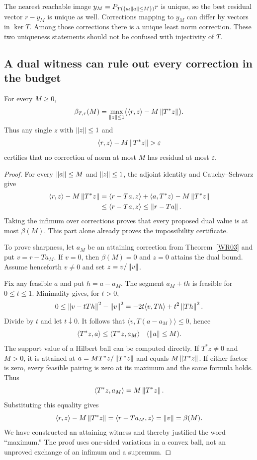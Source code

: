 The nearest reachable image $y_M=P_{T(\{a:\left\lVert a\right\rVert\le M\})}r$ is unique, so the best residual vector $r-y_M$ is unique as well. Corrections mapping to $y_M$ can differ by vectors in $\ker T$. Among those corrections there is a unique least norm correction. These two uniqueness statements should not be confused with injectivity of $T$.

\subsection{A dual witness can rule out every correction in the budget}
\begin{theorem}\label{WR04}
For every $M\ge0$,
\begin{equation}\label{eq:budget-dual}
 \beta_{T,r}(M)=
 \max_{\left\lVert z\right\rVert\le1}\bigl(\langle r,z\rangle-M\left\lVert T^*z\right\rVert\bigr).
\end{equation}
Thus any single $z$ with $\left\lVert z\right\rVert\le1$ and
\[
 \langle r,z\rangle-M\left\lVert T^*z\right\rVert>\varepsilon
\]
certifies that no correction of norm at most $M$ has residual at most $\varepsilon$.
\end{theorem}
\begin{proof}
For every $\left\lVert a\right\rVert\le M$ and $\left\lVert z\right\rVert\le1$, the adjoint identity and Cauchy--Schwarz give
\[
\begin{aligned}
 \langle r,z\rangle-M\left\lVert T^*z\right\rVert
 &=\langle r-Ta,z\rangle+\langle a,T^*z\rangle-M\left\lVert T^*z\right\rVert\\
 &\le\langle r-Ta,z\rangle
 \le\left\lVert r-Ta\right\rVert.
\end{aligned}
\]
Taking the infimum over corrections proves that every proposed dual value is at most $\beta(M)$. This part alone already proves the impossibility certificate.

To prove sharpness, let $a_M$ be an attaining correction from Theorem~\ref{WR03} and put $v=r-Ta_M$. If $v=0$, then $\beta(M)=0$ and $z=0$ attains the dual bound. Assume henceforth $v\ne0$ and set $z=v/\left\lVert v\right\rVert$.

Fix any feasible $a$ and put $h=a-a_M$. The segment $a_M+th$ is feasible for $0\le t\le1$. Minimality gives, for $t>0$,
\[
 0\le\left\lVert v-tTh\right\rVert^2-\left\lVert v\right\rVert^2
   =-2t\langle v,Th\rangle+t^2\left\lVert Th\right\rVert^2.
\]
Divide by $t$ and let $t\downarrow0$. It follows that $\langle v,T(a-a_M)\rangle\le0$, hence
\[
 \langle T^*z,a\rangle\le\langle T^*z,a_M\rangle
 \quad(\left\lVert a\right\rVert\le M).
\]
The support value of a Hilbert ball can be computed directly. If $T^*z\ne0$ and $M>0$, it is attained at $a=M T^*z/\left\lVert T^*z\right\rVert$ and equals $M\left\lVert T^*z\right\rVert$. If either factor is zero, every feasible pairing is zero at its maximum and the same formula holds. Thus
\[
 \langle T^*z,a_M\rangle=M\left\lVert T^*z\right\rVert.
\]
Substituting this equality gives
\[
 \langle r,z\rangle-M\left\lVert T^*z\right\rVert
 =\langle r-Ta_M,z\rangle=\left\lVert v\right\rVert=\beta(M).
\]
We have constructed an attaining witness and thereby justified the word ``maximum.'' The proof uses one-sided variations in a convex ball, not an unproved exchange of an infimum and a supremum.
\end{proof}

